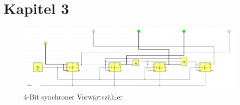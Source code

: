 \section{Kapitel 3
}

\begin{figure}[H]
    \centering
    \includegraphics[width=1.0\columnwidth]{bilder/schaltung1.png}
    \caption{4-Bit synchroner Vorwärtszähler}
    \label{fig:4-Bit synchroner Vorwärtszähler}
\end{figure}


\newpage